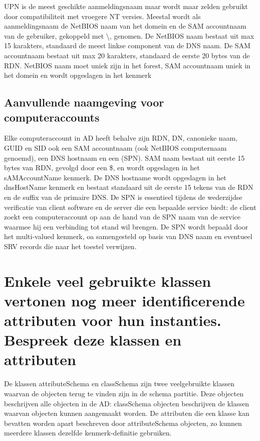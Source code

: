 UPN is de meest geschikte aanmeldingsnaam maar wordt maar zelden gebruikt door
compatibiliteit met vroegere NT versies. Meestal wordt als aanmeldingsnaam de
NetBIOS naam van het domein en de SAM accountnaam van de gebruiker, gekoppeld
met \textbackslash, genomen. De NetBIOS naam bestaat uit max 15 karakters, standaard de meest
linkse component van de DNS naam. De SAM accountnaam bestaat uit max 20
karakters, standaard de eerste 20 bytes van de RDN. NetBIOS naam moet uniek zijn
in het forest, SAM accountnaam uniek in het domein en wordt opgeslagen in het
 kenmerk

\subsection{Aanvullende naamgeving voor computeraccounts}

Elke computeraccount in AD heeft behalve zijn RDN, DN, canonieke naam, GUID en
SID ook een SAM accountnaam (ook NetBIOS computernaam genoemd), een DNS hostnaam
en een  (SPN).
SAM naam bestaat uit eerste 15 bytes van RDN, gevolgd door een \$, en wordt
opgeslagen in het sAMAccountName kenmerk.
De DNS hostname wordt opgeslagen in het dnsHostName kenmerk en bestaat
standaard uit de eerste 15 tekens van de RDN en de suffix van de primaire DNS.
De SPN is essentieel tijdens de wederzijdse verificatie van client software en
de server die een bepaalde service biedt: de client zoekt een computeraccount op
aan de hand van de SPN naam van de service waarmee hij een verbinding tot stand
wil brengen. De SPN wordt bepaald door het multi-valued
 kenmerk, oa samengesteld op basis van DNS naam en
eventueel SRV records die naar het toestel verwijzen.

\section{Enkele veel gebruikte klassen vertonen nog meer identificerende
attributen voor hun instanties. Bespreek deze klassen en attributen}

De klassen attributeSchema en classSchema zijn twee veelgebruikte klassen waarvan
de objecten terug te vinden zijn in de schema partitie. Deze objecten
beschrijven alle objecten in de AD: classSchema objecten beschrijven de klassen
waarvan objecten kunnen aangemaakt worden. De attributen die een klasse kan
bevatten worden apart beschreven door attributeSchema objecten, zo kunnen
meerdere klassen dezelfde kenmerk-definitie gebruiken.


